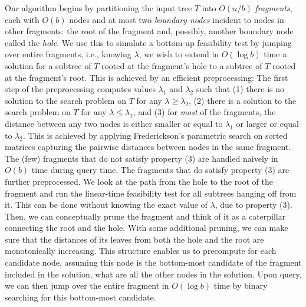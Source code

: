 \documentclass[a4paper,UKenglish]{lipics-v2016}
\theoremstyle{plain}
\begin{document}
Our algorithm begins by partitioning the input tree $T$ into $O(n/b)$ {\em fragments}, each with $O(b)$ nodes and at most two {\em boundary nodes} incident to nodes in other fragments: the root of the fragment and, possibly, another boundary node called the {\em hole}.
We use this to simulate a bottom-up feasibility test by jumping over entire 
fragments, i.e., knowing $\lambda$, we wish to extend in $O(\log b)$ time a solution for a subtree of $T$ rooted at the fragment's hole to a subtree of $T$ rooted at the fragment's root. This is achieved by an efficient preprocessing: 
% 
The first step of the preprocessing computes values $\lambda_1$ and  $\lambda_2$ such that (1) there is no solution to the search problem on $T$ for any $\lambda \geq \lambda_2$, (2) there is a solution to the search problem on $T$ for any $\lambda \le \lambda_1$, and (3) for {\em most} of the fragments, the distance between any two nodes is either smaller or equal to $\lambda_1$ or larger or equal to $\lambda_2$. This is achieved by applying Frederickson's parametric search on sorted matrices capturing the pairwise distances between nodes in the same fragment. The (few) fragments that do not satisfy property (3) are handled naively in $O(b)$ time during query time. 
The fragments that do satisfy property (3) are further preprocessed. We look at the path from the hole to the root of the
fragment and run the linear-time feasibility test for all subtrees hanging off from it. This can be done without knowing the exact value of $\lambda$, due to property (3). Then, we can conceptually
prune the fragment and think of it as a caterpillar connecting the root and the hole.
With some additional pruning, we can make sure that the distances of its leaves from both the hole and the root are monotonically increasing. This structure enables us to precompute for each candidate node, assuming this node is the bottom-most candidate
of the fragment included in the solution, what are all the other nodes in the solution. Upon query, we can then jump over the entire fragment  in $O(\log b)$ time by binary searching for this bottom-most candidate.
\end{document}
